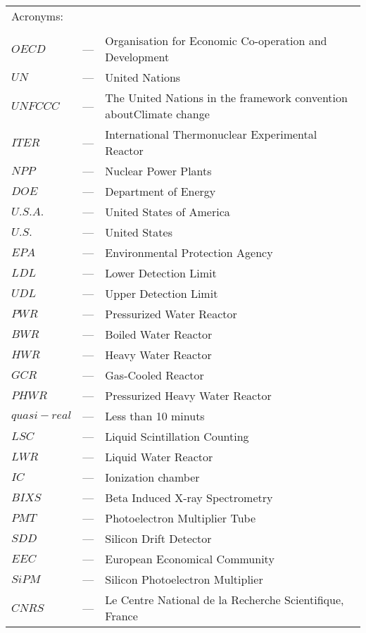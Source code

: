 \begin{longtable}{p{25mm} c p{120mm} }
\multicolumn{3}{l}{Acronyms:}\\
\\
$OECD$ & --- & Organisation for Economic Co-operation and Development\\
$UN$ & --- & United Nations\\
$UNFCCC$ & --- & The United Nations in the framework convention about\newline Climate change\\
$ITER$ & --- & International Thermonuclear Experimental Reactor\\
$NPP$ & --- & Nuclear Power Plants\\
$DOE$ & --- & Department of Energy\\
$U.S.A.$ & --- & United States of America\\
$U.S.$ & --- & United States\\
$EPA$ & --- & Environmental Protection Agency\\
$LDL$ & --- & Lower Detection Limit\\
$UDL$ & --- & Upper Detection Limit\\
$PWR$ & --- & Pressurized Water Reactor\\
$BWR$ & --- & Boiled Water Reactor\\
$HWR$ & --- & Heavy Water Reactor\\
$GCR$ & --- & Gas-Cooled Reactor\\
$PHWR$ & --- & Pressurized Heavy Water Reactor\\
$quasi-real$ & --- & Less than 10 minuts\\
$LSC$ & --- & Liquid Scintillation Counting\\
$LWR$ & --- & Liquid Water Reactor\\
$IC$ & --- & Ionization chamber\\
$BIXS$ & --- & Beta Induced X-ray Spectrometry\\
$PMT$ & --- & Photoelectron Multiplier Tube\\
$SDD$ & --- & Silicon Drift Detector\\
$EEC$ & --- & European Economical Community\\
$SiPM$ & --- & Silicon Photoelectron Multiplier\\
$CNRS$ & --- & Le Centre National de la Recherche Scientifique, France\\

\end{longtable}
